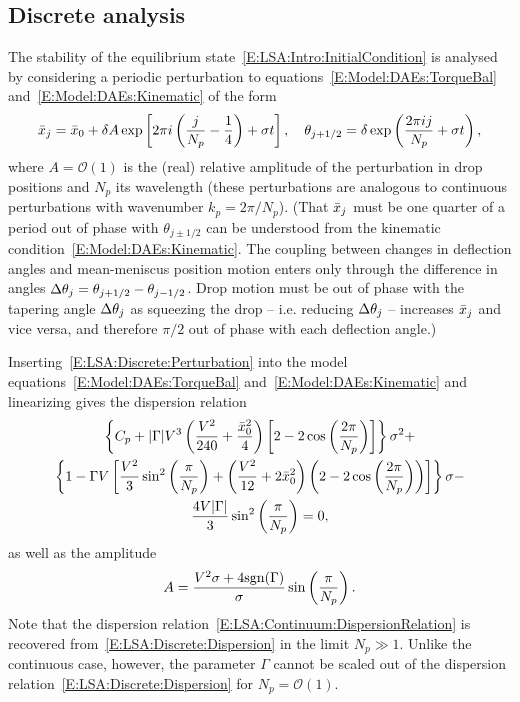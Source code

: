 \subsection{Discrete analysis}
The stability of the equilibrium state~\eqref{E:LSA:Intro:InitialCondition} is analysed by considering a periodic perturbation to equations~\eqref{E:Model:DAEs:TorqueBal} and~\eqref{E:Model:DAEs:Kinematic} of the form
\begin{equation} \label{E:LSA:Discrete:Perturbation}
\bar{x}_j = \bar{x}_0 + \delta A\exp \left[2\pi i\left(\frac{j}{N_p}-\frac{1}{4}\right)+ \sigma t\right],\quad  \theta_{j+1/2} = \delta \exp \left(\frac{2\pi i j}{N_p} +\sigma t\right),
 \end{equation}
where $A = \mathcal{O}(1)$ is the (real) relative amplitude of the perturbation in drop positions and $N_p$ its wavelength (these perturbations are analogous to continuous perturbations with wavenumber $k_p = 2\pi/N_p$). (That $\bar{x}_j$ must be one quarter of a period out of phase with $\theta_{j\pm1/2}$ can be understood from the kinematic condition~\eqref{E:Model:DAEs:Kinematic}. The coupling between changes in deflection angles and mean-meniscus position motion enters only through the difference in angles $\Delta \theta_j = \theta_{j+1/2} - \theta_{j-1/2}$. Drop motion must be out of phase with   the tapering angle $\Delta \theta_j$ as squeezing the drop -- i.e. reducing $\Delta \theta_j$ -- increases $\bar{x}_j$ and vice versa, and therefore $\pi/2$ out of phase with each deflection angle.)

Inserting~\eqref{E:LSA:Discrete:Perturbation} into the model equations~\eqref{E:Model:DAEs:TorqueBal} and~\eqref{E:Model:DAEs:Kinematic} and linearizing gives the dispersion relation
\begin{multline}\label{E:LSA:Discrete:Dispersion}
\left\{C_p+ |\Gamma|V^3\left(\frac{V^2}{240} + \frac{\bar{x}_0^2}{4}\right)\left[2 - 2\cos\left(\frac{2\pi}{N_p}\right)\right]\right\}\sigma^2 +\\ \left\{1 - \Gamma V\left[\frac{V^2}{3} \sin^2 \left(\frac{\pi}{N_p}\right) +\left( \frac{V^2}{12}+ 2\bar{x}_0^2\right)\left(2 - 2\cos\left(\frac{2\pi}{N_p}\right)\right)\right]\right\}\sigma-\\ \frac{4V|\Gamma|}{3}\sin^2\left(\frac{\pi}{N_p}\right) = 0,
\end{multline}
as well as the amplitude
\begin{equation}\label{E:LSA:Discrete:Amplitude}
A = \frac{V^2 \sigma + 4 \mathrm{sgn}(\Gamma)}{\sigma}\sin\left(\frac{\pi}{N_p}\right).
\end{equation}
Note that the dispersion relation~\eqref{E:LSA:Continuum:DispersionRelation} is recovered from~\eqref{E:LSA:Discrete:Dispersion} in the limit $N_p \gg 1$. Unlike the continuous case, however, the parameter $\Gamma$ cannot be scaled out of the dispersion relation~\eqref{E:LSA:Discrete:Dispersion} for $N_p = \mathcal{O}(1)$.

